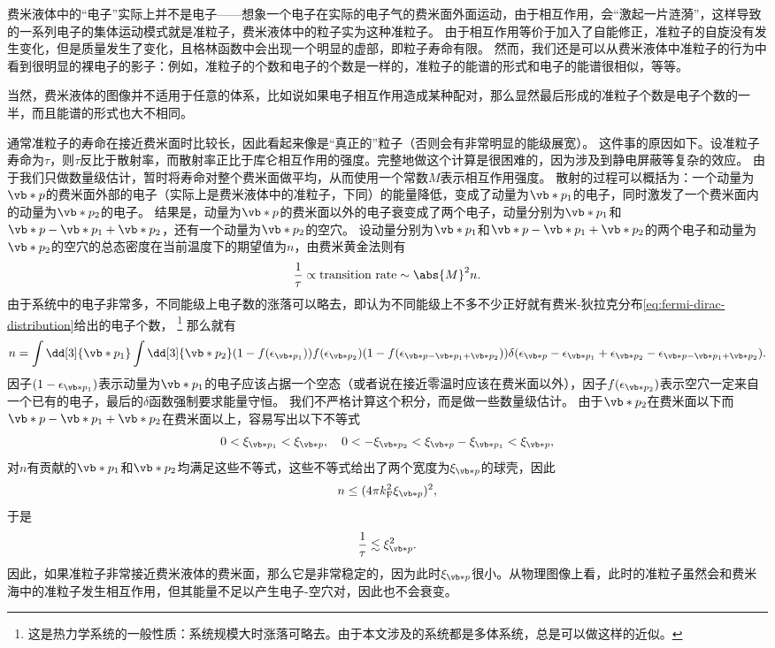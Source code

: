费米液体中的“电子”实际上并不是电子——想象一个电子在实际的电子气的费米面外面运动，由于相互作用，会“激起一片涟漪”，这样导致的一系列电子的集体运动模式就是准粒子，费米液体中的粒子实为这种准粒子。
由于相互作用等价于加入了自能修正，准粒子的自旋没有发生变化，但是质量发生了变化，且格林函数中会出现一个明显的虚部，即粒子寿命有限。
然而，我们还是可以从费米液体中准粒子的行为中看到很明显的裸电子的影子：例如，准粒子的个数和电子的个数是一样的，准粒子的能谱的形式和电子的能谱很相似，等等。

当然，费米液体的图像并不适用于任意的体系，比如说如果电子相互作用造成某种配对，那么显然最后形成的准粒子个数是电子个数的一半，而且能谱的形式也大不相同。

通常准粒子的寿命在接近费米面时比较长，因此看起来像是“真正的”粒子（否则会有非常明显的能级展宽）。
这件事的原因如下。设准粒子寿命为$\tau$，则$\tau$反比于散射率，而散射率正比于库仑相互作用的强度。完整地做这个计算是很困难的，因为涉及到静电屏蔽等复杂的效应。
由于我们只做数量级估计，暂时将寿命对整个费米面做平均，从而使用一个常数$M$表示相互作用强度。
散射的过程可以概括为：一个动量为$\vb*{p}$的费米面外部的电子（实际上是费米液体中的准粒子，下同）的能量降低，变成了动量为$\vb*{p}_1$的电子，同时激发了一个费米面内的动量为$\vb*{p}_2$的电子。
结果是，动量为$\vb*{p}$的费米面以外的电子衰变成了两个电子，动量分别为$\vb*{p}_1$和$\vb*{p} - \vb*{p}_1 + \vb*{p}_2$，还有一个动量为$\vb*{p}_2$的空穴。
设动量分别为$\vb*{p}_1$和$\vb*{p} - \vb*{p}_1 + \vb*{p}_2$的两个电子和动量为$\vb*{p}_2$的空穴的总态密度在当前温度下的期望值为$n$，由费米黄金法则有
\[
    \frac{1}{\tau} \propto \text{transition rate} \sim \abs{M}^2 n.
\]
由于系统中的电子非常多，不同能级上电子数的涨落可以略去，即认为不同能级上不多不少正好就有费米-狄拉克分布\eqref{eq:fermi-dirac-distribution}给出的电子个数，%
\footnote{这是热力学系统的一般性质：系统规模大时涨落可略去。由于本文涉及的系统都是多体系统，总是可以做这样的近似。}%
那么就有
\[
    n = \int \dd[3]{\vb*{p}_1} \int \dd[3]{\vb*{p}_2} (1 - f(\epsilon_{\vb*{p}_1})) f(\epsilon_{\vb*{p}_2}) (1 - f(\epsilon_{\vb*{p} - \vb*{p}_1 + \vb*{p}_2})) \delta(\epsilon_{\vb*{p}} - \epsilon_{\vb*{p}_1} + \epsilon_{\vb*{p}_2} - \epsilon_{\vb*{p} - \vb*{p}_1 + \vb*{p}_2}).
\]
因子$(1-\epsilon_{\vb*{p}_1})$表示动量为$\vb*{p}_1$的电子应该占据一个空态（或者说在接近零温时应该在费米面以外），因子$f(\epsilon_{\vb*{p}_2})$表示空穴一定来自一个已有的电子，最后的$\delta$函数强制要求能量守恒。
我们不严格计算这个积分，而是做一些数量级估计。
由于$\vb*{p}_2$在费米面以下而$\vb*{p}- \vb*{p}_1 + \vb*{p}_2$在费米面以上，容易写出以下不等式
\[
    0 < \xi_{\vb*{p}_1} < \xi_{\vb*{p}}, \quad 0 < - \xi_{\vb*{p}_2} < \xi_{\vb*{p}} - \xi_{\vb*{p}_1} < \xi_{\vb*{p}},
\]
对$n$有贡献的$\vb*{p}_1$和$\vb*{p}_2$均满足这些不等式，这些不等式给出了两个宽度为$\xi_{\vb*{p}}$的球壳，因此
\[
    n \leq (4 \pi k_\text{F}^2 \xi_{\vb*{p}})^2,
\]
于是
\begin{equation}
    \frac{1}{\tau} \lesssim \xi_{\vb*{p}}^2.
\end{equation}
因此，如果准粒子非常接近费米液体的费米面，那么它是非常稳定的，因为此时$\xi_{\vb*{p}}$很小。从物理图像上看，此时的准粒子虽然会和费米海中的准粒子发生相互作用，但其能量不足以产生电子-空穴对，因此也不会衰变。


